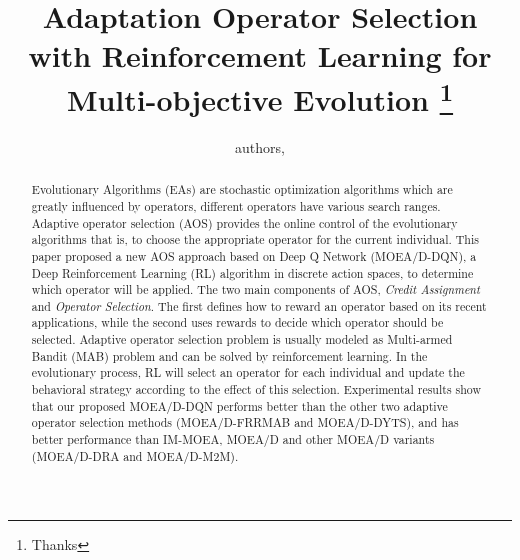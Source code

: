 \documentclass[journal]{IEEEtran}
\begin{document}
\title{{Adaptation Operator Selection with Reinforcement Learning for Multi-objective Evolution}
  \thanks{Thanks}}
\author{
  authors,
}%



\maketitle

\begin{abstract}
  Evolutionary Algorithms (EAs) are stochastic optimization algorithms which are greatly influenced by operators, different operators have various search ranges.
  Adaptive operator selection (AOS) provides the online control of the evolutionary algorithms that is, to choose the appropriate operator for the current individual.
  This paper proposed a new AOS approach based on Deep Q Network (MOEA/D-DQN), a Deep Reinforcement Learning (RL) algorithm in discrete action spaces, to determine which operator will be applied.
  The two main components of AOS, \textit{Credit Assignment} and \textit{Operator Selection}. The first defines how to reward an operator based on its recent applications, while the second uses rewards to decide which operator should be selected.
  Adaptive operator selection problem is usually modeled as Multi-armed Bandit (MAB) problem and can be solved by reinforcement learning.
  In the evolutionary process, RL will select an operator for each individual and update the behavioral strategy according to the effect of this selection.
  Experimental results show that our proposed MOEA/D-DQN performs better than the other two adaptive operator selection methods (MOEA/D-FRRMAB and MOEA/D-DYTS), and has better performance than IM-MOEA, MOEA/D and other MOEA/D variants (MOEA/D-DRA and MOEA/D-M2M).

\end{abstract}
\end{document}
